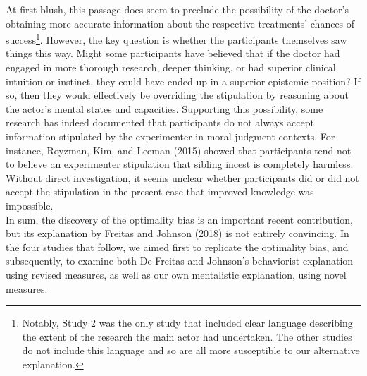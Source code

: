 \documentclass[
  man, donotrepeattitle,floatsintext]{apa6}
\begin{document}
At first blush, this passage does seem to preclude the possibility of the doctor's obtaining more accurate information about the respective treatments' chances of success\footnote{Notably, Study 2 was the only study that included clear language describing the extent of the research the main actor had undertaken. The other studies do not include this language and so are all more susceptible to our alternative explanation.}. However, the key question is whether the participants themselves saw things this way. Might some participants have believed that if the doctor had engaged in more thorough research, deeper thinking, or had superior clinical intuition or instinct, they could have ended up in a superior epistemic position? If so, then they would effectively be overriding the stipulation by reasoning about the actor's mental states and capacities. Supporting this possibility, some research has indeed documented that participants do not always accept information stipulated by the experimenter in moral judgment contexts. For instance, Royzman, Kim, and Leeman (2015) showed that participants tend not to believe an experimenter stipulation that sibling incest is completely harmless. Without direct investigation, it seems unclear whether participants did or did not accept the stipulation in the present case that improved knowledge was impossible.\\
In sum, the discovery of the optimality bias is an important recent contribution, but its explanation by Freitas and Johnson (2018) is not entirely convincing. In the four studies that follow, we aimed first to replicate the optimality bias, and subsequently, to examine both De Freitas and Johnson's behaviorist explanation using revised measures, as well as our own mentalistic explanation, using novel measures.\\
\end{document}
